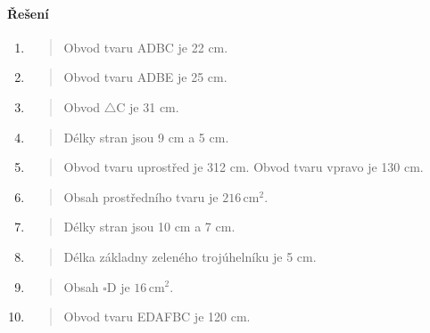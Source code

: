 \paragraph{Řešení}
\begin{enumerate}
    \item
    \begin{quote}
        Obvod tvaru ADBC je 22 cm.
    \end{quote}

    \item
    \begin{quote}
        Obvod tvaru ADBE je 25 cm.
    \end{quote}

    \item
    \begin{quote}
        Obvod $\triangle$C je 31 cm.
    \end{quote}

    \item
    \begin{quote}
        Délky stran jsou 9 cm a 5 cm.
    \end{quote}

    \item
    \begin{quote}
        Obvod tvaru uprostřed je 312 cm.
        Obvod tvaru vpravo je 130 cm.
    \end{quote}

    \item
    \begin{quote}
        Obsah prostředního tvaru je $216\,\text{cm}^{2}$.
    \end{quote}

    \item
    \begin{quote}
        Délky stran jsou 10 cm a 7 cm.
    \end{quote}

    \item
    \begin{quote}
        Délka základny zeleného trojúhelníku je 5 cm.
    \end{quote}

    \item
    \begin{quote}
        Obsah $\square$D je $16\,\text{cm}^{2}$.
    \end{quote}

    \item
    \begin{quote}
        Obvod tvaru EDAFBC je 120 cm.
    \end{quote}
\end{enumerate}

